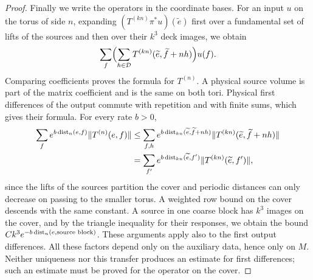 \begin{proof}
Finally we write the operators in the coordinate bases. For an input $u$ on the torus of side $n$, expanding $(T^{(kn)}\pi^*u)(\widetilde e)$ first over a fundamental set of lifts of the sources and then over their $k^3$ deck images, we obtain
\[
 \sum_f\Bigl(\sum_{h\in\mathcal D}T^{(kn)}(\widetilde e,\widetilde f+nh)\Bigr)u(f).
\]
Comparing coefficients proves the formula for $T^{(n)}$. A physical source volume is part of the matrix coefficient and is the same on both tori. Physical first differences of the output commute with repetition and with finite sums, which gives their formula. For every rate $b>0$,
\begin{equation}\label{ch06:eq:cover-weighted-row}
 \begin{split}
 \sum_fe^{b\operatorname{dist}_n(e,f)}\lVert T^{(n)}(e,f)\rVert&\le\sum_{f,h}e^{b\operatorname{dist}_{kn}(\widetilde e,\widetilde f+nh)}\lVert T^{(kn)}(\widetilde e,\widetilde f+nh)\rVert\\
 &=\sum_{f'}e^{b\operatorname{dist}_{kn}(\widetilde e,f')}\lVert T^{(kn)}(\widetilde e,f')\rVert,
 \end{split}
\end{equation}
since the lifts of the sources partition the cover and periodic distances can only decrease on passing to the smaller torus. A weighted row bound on the cover descends with the same constant. A source in one coarse block has $k^3$ images on the cover, and by the triangle inequality for their responses, we obtain the bound $Ck^3e^{-b\operatorname{dist}_n(e,\text{source block})}$. These arguments apply also to the first output differences. All these factors depend only on the auxiliary data, hence only on $M$. Neither uniqueness nor this transfer produces an estimate for first differences; such an estimate must be proved for the operator on the cover.
\end{proof}

